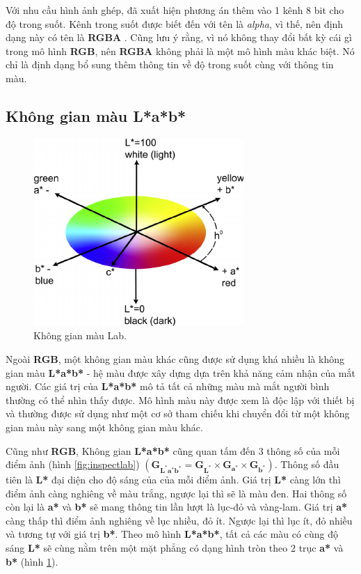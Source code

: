 \documentclass[a4paper, 12pt]{report}
\begin{document}
Với nhu cầu hình ảnh ghép, đã xuất hiện phương án thêm vào 1 kênh 8 bit cho độ trong suốt.
Kênh trong suốt được biết đến với tên là \textit{alpha}, vì thế, nên định dạng này có tên là \textbf{RGBA} \cite{wikirgba2021}. Cũng lưu ý rằng, vì nó không thay đổi bất kỳ cái gì trong mô hình \textbf{RGB}, nên \textbf{RGBA} không phải là một mô hình màu khác biệt.
Nó chỉ là định dạng bổ sung thêm thông tin về độ trong suốt cùng với thông tin màu.

\subsection{Không gian màu L*a*b*}\label{introtolabspace}

\begin{figure}
\includegraphics[width=8cm]{images/2_2.png} 
\caption{Không gian màu Lab.}
\label{fig:labspace}
\end{figure}

Ngoài \textbf{RGB}, một không gian màu khác cũng được sử dụng khá nhiều là không gian màu \textbf{L*a*b*} \cite{wikilab2021} - hệ màu được xây dựng dựa trên khả năng cảm nhận của mắt người.
Các giá trị của \textbf{L*a*b*} mô tả tất cả những màu mà mắt người bình thường có thể nhìn thấy được.
Mô hình màu này được xem là độc lập với thiết bị và thường được sử dụng như một cơ sở tham chiếu khi chuyển đổi từ một không gian màu này sang một không gian màu khác.\vspace{5pt}

Cũng như \textbf{RGB}, Không gian \textbf{L*a*b*} cũng quan tấm đến 3 thông số của mỗi điểm ảnh (hình \ref{fig:inspectlab}) $\left(\bm{G}_{\mathbf{L^*}\mathbf{a^*}\mathbf{b^*}} = \bm{G}_{\mathbf{L}^*} \times \bm{G}_{\mathbf{a}^*} \times \bm{G}_{\mathbf{b}^*}\right)$.
Thông số đầu tiên là \textbf{L*} đại diện cho độ sáng của của mỗi điểm ảnh.
Giá trị \textbf{L*} càng lớn thì điểm ảnh càng nghiêng về màu trắng, ngược lại thì sẽ là màu đen.
Hai thông số còn lại là \textbf{a*} và \textbf{b*} sẽ mang thông tin lần lượt là lục-đỏ và vàng-lam.
Giá trị \textbf{a*} càng thấp thì điểm ảnh nghiêng về lục nhiều, đỏ ít.
Ngược lại thì lục ít, đỏ nhiều và tương tự với giá trị \textbf{b*}.
Theo mô hình \textbf{L*a*b*}, tất cả các màu có cùng độ sáng \textbf{L*} sẽ cùng nằm trên một mặt phẳng có dạng hình tròn theo 2 trục \textbf{a*} và \textbf{b*} (hình \ref{fig:labspace}).\vspace{5pt}
\end{document}
